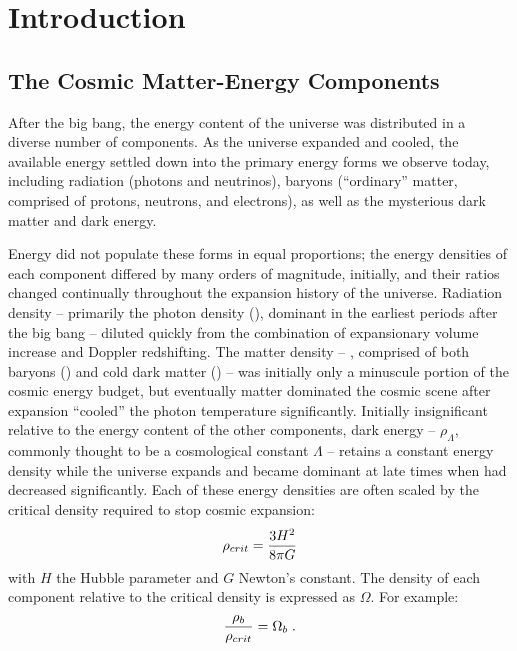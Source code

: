 
\chapter{Introduction}
\label{chap:Intro}
\section{The Cosmic Matter-Energy Components}
\label{sec:Intro.Components}
After the big bang, the energy content of the universe was distributed
in a diverse number of components. As the universe expanded and
cooled, the available energy settled down into the primary energy
forms we observe today, including radiation (photons and neutrinos),
baryons (``ordinary'' matter, comprised of protons, neutrons, and
electrons), as well as the mysterious dark matter and dark energy.

Energy did not populate these forms in equal proportions; the energy
densities of each component differed by many orders of magnitude,
initially, and their ratios changed continually throughout the
expansion history of the universe. Radiation density -- primarily the
photon density (\rhog), dominant in the earliest periods after the big
bang -- diluted quickly from the combination of expansionary volume
increase and Doppler redshifting. The matter density -- \rhom,
comprised of both baryons (\rhob) and cold dark matter (\rhoc) -- was
initially only a minuscule portion of the cosmic energy budget, but
eventually matter dominated the cosmic scene after expansion
``cooled'' the photon temperature significantly. Initially
insignificant relative to the energy content of the other components,
dark energy -- $\rho_\Lambda$, commonly thought to be a cosmological
constant $\Lambda$ -- retains a constant energy density while the
universe expands and became dominant at late times when \rhom{} had
decreased significantly. Each of these energy densities are often
scaled by the critical density required to stop cosmic expansion:
\begin{equation}
\rho_{crit} = \frac{3H^2}{8\pi{}G} 
\end{equation}
with $H$ the Hubble parameter and $G$ Newton's constant. The density of each component relative to the critical
density is expressed as $\Omega$. For example:
\begin{equation}
\frac{\rho_b}{\rho_{crit}} = \Omega_b\;.
\end{equation}



